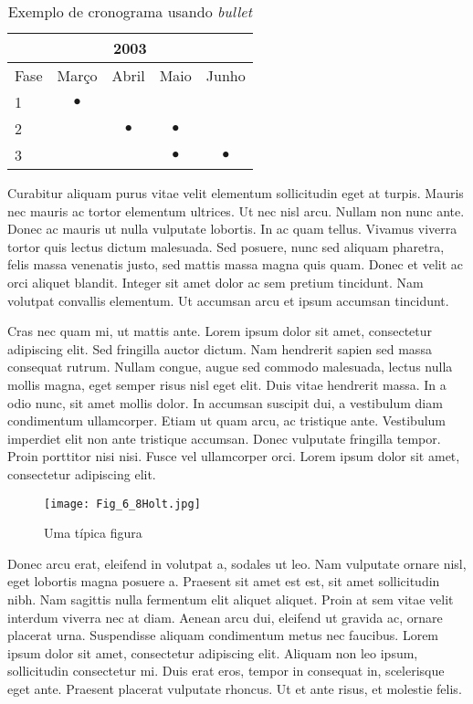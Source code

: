\begin{table}
 \begin{center}
  \begin{tabular}{|l||c|c|c|c|}
    \hline
    \multicolumn{5}{|c|}{2003} \\ \hline \hline
    \multicolumn{1}{|c||}{Fase} & Mar\c{c}o     & Abril     & Maio     & Junho   \\ \hline
    1    & $\bullet$ &           &          &         \\
    2    &           & $\bullet$ & $\bullet$&         \\ 
    3    &           &           & $\bullet$& $\bullet$ \\
    \hline
    \hline
   \end{tabular}
   \caption{Exemplo de cronograma usando \textit{bullet}}
  \end{center}
 \label{tab3}
\end{table}


Curabitur aliquam purus vitae velit elementum sollicitudin eget at turpis. Mauris nec mauris ac tortor elementum ultrices. Ut nec nisl arcu. Nullam non nunc ante. Donec ac mauris ut nulla vulputate lobortis. In ac quam tellus. Vivamus viverra tortor quis lectus dictum malesuada. Sed posuere, nunc sed aliquam pharetra, felis massa venenatis justo, sed mattis massa magna quis quam. Donec et velit ac orci aliquet blandit. Integer sit amet dolor ac sem pretium tincidunt. Nam volutpat convallis elementum. Ut accumsan arcu et ipsum accumsan tincidunt.

Cras nec quam mi, ut mattis ante. Lorem ipsum dolor sit amet, consectetur adipiscing elit. Sed fringilla auctor dictum. Nam hendrerit sapien sed massa consequat rutrum. Nullam congue, augue sed commodo malesuada, lectus nulla mollis magna, eget semper risus nisl eget elit. Duis vitae hendrerit massa. In a odio nunc, sit amet mollis dolor. In accumsan suscipit dui, a vestibulum diam condimentum ullamcorper. Etiam ut quam arcu, ac tristique ante. Vestibulum imperdiet elit non ante tristique accumsan. Donec vulputate fringilla tempor. Proin porttitor nisi nisi. Fusce vel ullamcorper orci. Lorem ipsum dolor sit amet, consectetur adipiscing elit. 


\begin{figure}[!htp]
\centering
\texttt{[image: Fig\_6\_8Holt.jpg]}
\caption{Uma t\'{i}pica figura}
\end{figure}


Donec arcu erat, eleifend in volutpat a, sodales ut leo. Nam vulputate ornare nisl, eget lobortis magna posuere a. Praesent sit amet est est, sit amet sollicitudin nibh. Nam sagittis nulla fermentum elit aliquet aliquet. Proin at sem vitae velit interdum viverra nec at diam. Aenean arcu dui, eleifend ut gravida ac, ornare placerat urna. Suspendisse aliquam condimentum metus nec faucibus. Lorem ipsum dolor sit amet, consectetur adipiscing elit. Aliquam non leo ipsum, sollicitudin consectetur mi. Duis erat eros, tempor in consequat in, scelerisque eget ante. Praesent placerat vulputate rhoncus. Ut et ante risus, et molestie felis.


